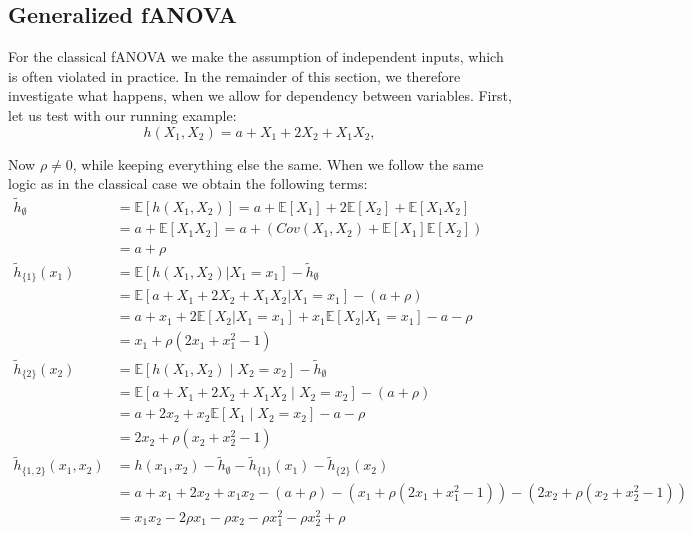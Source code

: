 \subsection{Generalized fANOVA}
For the classical fANOVA we make the assumption of independent inputs, which is often violated in practice. In the remainder of this section, we therefore investigate what happens, when we allow for dependency between variables. First, let us test with our running example:
\[
h(X_1, X_2) = a + X_1 + 2X_2 + X_1 X_2,
\]

Now $\rho\neq 0$, while keeping everything else the same. When we follow the same logic as in the classical case we obtain the following terms:
\begin{align*}
\tilde{h}_{\emptyset} &= \mathbb{E}[h(X_1, X_2)] 
= a + \mathbb{E}[X_1] + 2\mathbb{E}[X_2] + \mathbb{E}[X_1 X_2] \\
&= a + \mathbb{E}[X_1 X_2] 
= a + \left( Cov(X_1, X_2) + \mathbb{E}[X_1]\mathbb{E}[X_2] \right) \\
&= a + \rho \\
\tilde{h}_{\{1\}}(x_1) 
&= \mathbb{E}[h(X_1, X_2) | X_1 = x_1] - \tilde{h}_{\emptyset} \\
&= \mathbb{E}[a + X_1 + 2X_2 + X_1 X_2 | X_1 = x_1] - (a + \rho) \\
&= a + x_1 + 2\mathbb{E}[X_2 | X_1 = x_1] + x_1 \mathbb{E}[X_2 | X_1 = x_1] - a - \rho \\
&= x_1 + \rho(2x_1 + x_1^2 - 1) \\
\tilde{h}_{\{2\}}(x_2) 
&= \mathbb{E}[h(X_1, X_2) \mid X_2 = x_2] - \tilde{h}_{\emptyset} \\
&= \mathbb{E}[a + X_1 + 2X_2 + X_1 X_2 \mid X_2 = x_2] - (a + \rho) \\
&= a + 2x_2 + x_2 \mathbb{E}[X_1 \mid X_2 = x_2] - a - \rho \\
&= 2x_2 + \rho(x_2 + x_2^2 - 1) \\
\tilde{h}_{\{1,2\}}(x_1, x_2) 
&= h(x_1, x_2) - \tilde{h}_{\emptyset} - \tilde{h}_{\{1\}}(x_1) - \tilde{h}_{\{2\}}(x_2) \\
&= a + x_1 + 2x_2 + x_1 x_2 - (a + \rho) - (x_1 + \rho(2x_1 + x_1^2 - 1)) - (2x_2 + \rho(x_2 + x_2^2 - 1))\\
&= x_1 x_2 - 2\rho x_1 - \rho x_2  - \rho x_1^2  - \rho x_2^2 + \rho
\end{align*}

